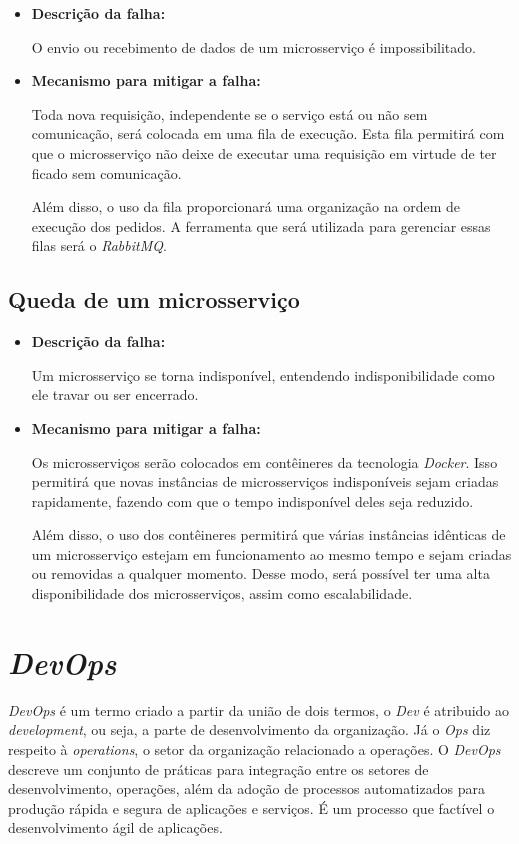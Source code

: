 \begin{itemize}
    \item \textbf{Descrição da falha:}
    
     O envio ou recebimento de dados de um microsserviço é impossibilitado.
    
    \item \textbf{Mecanismo para mitigar a falha:}
    
    Toda nova requisição, independente se o serviço está ou não sem comunicação, será colocada em uma fila de execução. Esta fila permitirá com que o microsserviço não deixe de executar uma requisição em virtude de ter ficado sem comunicação.
    
    Além disso, o uso da fila proporcionará uma organização na ordem de execução dos pedidos. A ferramenta que será utilizada para gerenciar essas filas será o \textit{RabbitMQ}.
\end{itemize}

\subsection{Queda de um microsserviço}

\begin{itemize}
    \item \textbf{Descrição da falha:}
    
    Um microsserviço se torna indisponível, entendendo indisponibilidade como ele travar ou ser encerrado.
    
    \item \textbf{Mecanismo para mitigar a falha:}
    
    Os microsserviços serão colocados em contêineres da tecnologia \textit{Docker}. Isso permitirá que novas instâncias de microsserviços indisponíveis sejam criadas rapidamente, fazendo com que o tempo indisponível deles seja reduzido.

    Além disso, o uso dos contêineres permitirá que várias instâncias idênticas de um microsserviço estejam em funcionamento ao mesmo tempo e sejam criadas ou removidas a qualquer momento. Desse modo, será possível ter uma alta disponibilidade dos microsserviços, assim como escalabilidade.
\end{itemize}

\section{\textit{DevOps}}

\textit{DevOps} é um termo criado a partir da união de dois termos, o \textit{Dev} é atribuido ao \textit{development}, ou seja, a parte de desenvolvimento da organização. Já o \textit{Ops} diz respeito à \textit{operations}, o setor da organização relacionado a operações. O \textit{DevOps} descreve um conjunto de práticas para integração entre os setores de desenvolvimento, operações, além da adoção de processos automatizados para produção rápida e segura de aplicações e serviços. É um processo que factível o desenvolvimento ágil de aplicações.

